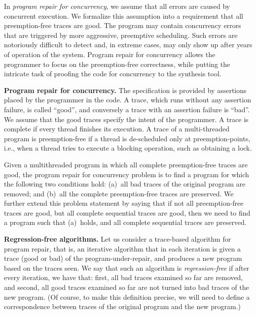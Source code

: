 \documentclass{llncs}
\begin{document}
In {\em program repair for concurrency}, we assume that all errors 
are caused by concurrent execution.
We formalize this assumption into a requirement that all preemption-free
traces are good. 
The program may contain concurrency errors that are triggered by more
aggressive, preemptive scheduling. 
Such errors are notoriously difficult to detect 
and, in extreme cases, may only show up after years of operation 
of the system. 
Program repair for concurrency allows the programmer to focus on the
preemption-free correctness, while putting 
the intricate task of proofing the code for concurrency to the
synthesis tool.

\noindent
{\bf Program repair for concurrency.} 
The specification is provided by assertions placed by the programmer 
in the code. 
A trace, which runs without any assertion failure, is called ``good'',
and conversely a trace with an assertion failure is ``bad''.
We assume that the good traces specify the intent of the programmer.
A trace is complete if every thread finishes its execution. 
A trace of a multi-threaded program is preemption-free if a thread is 
de-scheduled only at preemption-points, i.e., when a thread tries to
execute a blocking operation, such as obtaining a lock. 

Given a multithreaded program in which all complete preemption-free
traces are good, the  program repair for concurrency problem is to find
a program for which the following two conditions hold: 
(a)~all bad traces of the original program are removed; and 
(b)~all the complete preemption-free traces are preserved.
We further extend this problem statement by saying that if not all
preemption-free traces are good, but all complete sequential traces are
good, then we need to find a program such that (a)~holds, and all
complete sequential traces are preserved.

\noindent
{\bf Regression-free algorithms.} Let us consider a trace-based algorithm
for program repair, that is, an iterative algorithm that in each
iteration is given a trace (good or bad) of the program-under-repair,
and produces a new program based on the traces seen. 
We say that such an algorithm is {\em regression-free} if after every
iteration, we have that: first, all bad traces examined so far are
removed, and second, all good traces examined so far are not turned
into bad traces of the new program. (Of course, to make this
definition precise, we will need to define a correspondence between
traces of the original program and the new program.)
\end{document}
